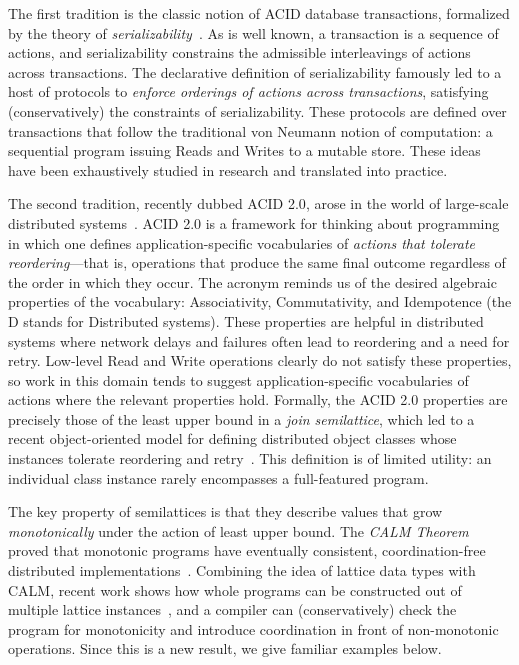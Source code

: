 \documentclass{sig-alternate}
\begin{document}
The first tradition is the classic notion of \textsf{ACID} database
transactions, formalized by the theory of \emph{serializability}~\cite{Papadimitriou1979}.
As is well known, a transaction is a sequence of actions, and serializability
constrains the admissible interleavings of actions across transactions.  The
declarative definition of serializability famously led to a host of protocols to
\emph{enforce orderings of actions across transactions}, satisfying
(conservatively) the constraints of serializability.  These protocols are
defined over transactions that follow the traditional von Neumann notion of
computation: a sequential program issuing Reads and Writes to a mutable store.
These ideas have been exhaustively studied in research and translated into
practice.

The second tradition, recently dubbed \textsf{ACID 2.0}, arose in the world of
large-scale distributed systems~\cite{Helland2009}.  ACID 2.0 is a framework for
thinking about programming in which one defines application-specific
vocabularies of \emph{actions that tolerate reordering}---that is, operations
that produce the same final outcome regardless of the order in which they occur.
The acronym reminds us of the desired algebraic properties of the vocabulary:
Associativity, Commutativity, and Idempotence (the D stands for Distributed
systems).  These properties are helpful in distributed systems where network
delays and failures often lead to reordering and a need for retry. Low-level
Read and Write operations clearly do not satisfy these properties, so work in
this domain tends to suggest application-specific vocabularies of actions where
the relevant properties hold.  Formally, the ACID 2.0 properties are precisely
those of the least upper bound in a \emph{join semilattice}, which led to a
recent object-oriented model for defining distributed object classes whose
instances tolerate reordering and retry~\cite{Shapiro2011a,Shapiro2011b}.  This
definition is of limited utility: an individual class instance rarely
encompasses a full-featured program.

The key property of semilattices is that they describe values that grow
\emph{monotonically} under the action of least upper bound.  The \emph{CALM
  Theorem} proved that monotonic programs have eventually consistent,
coordination-free distributed
implementations~\cite{Alvaro2011,Ameloot2011,Hellerstein2010}.  Combining the
idea of lattice data types with CALM, recent work shows how whole programs can
be constructed out of multiple lattice instances~\cite{Conway2012}, and a
compiler can (conservatively) check the program for monotonicity and introduce
coordination in front of non-monotonic operations.  Since this is a new result,
we give familiar examples below.
\end{document}
